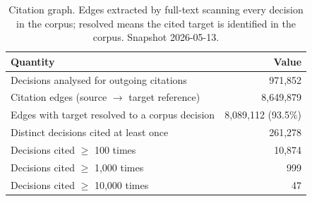 \begin{table}[t]
\centering
\caption{Citation graph. Edges extracted by full-text scanning every decision in the corpus; resolved means the cited target is identified in the corpus. Snapshot 2026-05-13.}
\label{tab:citation_graph}
\small
\begin{tabular}{l r}
\toprule
\textbf{Quantity} & \textbf{Value} \\
\midrule
Decisions analysed for outgoing citations & 971,852 \\
Citation edges (source $\to$ target reference) & 8,649,879 \\
Edges with target resolved to a corpus decision & 8,089,112 (93.5\%) \\
Distinct decisions cited at least once & 261,278 \\
Decisions cited $\geq$ 100 times & 10,874 \\
Decisions cited $\geq$ 1{,}000 times & 999 \\
Decisions cited $\geq$ 10{,}000 times & 47 \\
\bottomrule
\end{tabular}
\end{table}

